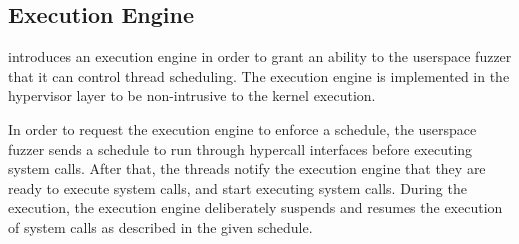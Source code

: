 

\subsection{Execution Engine}
\label{ss:engine}

\sys introduces an execution engine in order to grant an ability to
the userspace fuzzer that it can control thread scheduling.
%
The execution engine is implemented in the hypervisor layer to be
non-intrusive to the kernel execution.




%


%
In order to request the execution engine to enforce a schedule, the
userspace fuzzer sends a schedule to run through hypercall interfaces
before executing system calls.
%
After that, the threads notify the execution engine that they are
ready to execute system calls, and start executing system calls.
%
During the execution, the execution engine deliberately suspends and
resumes the execution of system calls as described in the given
schedule.

